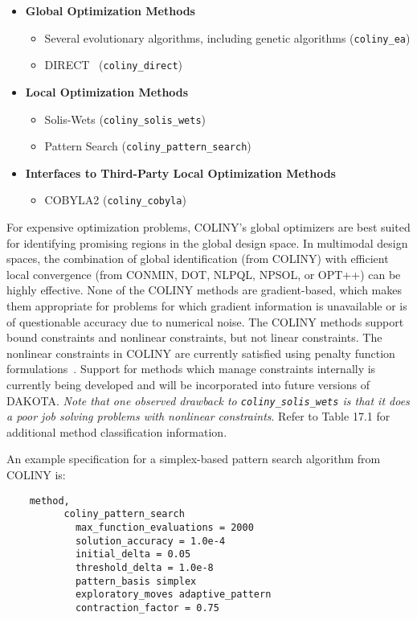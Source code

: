 \begin{itemize}

\item {\bf Global Optimization Methods}
\begin{itemize}
\item Several evolutionary algorithms, including genetic algorithms
      (\texttt{coliny\_ea})
\item DIRECT~\cite{Per93} (\texttt{coliny\_direct})
\end{itemize}

\item {\bf Local Optimization Methods}
\begin{itemize}
\item Solis-Wets (\texttt{coliny\_solis\_wets})
\item Pattern Search (\texttt{coliny\_pattern\_search})
\end{itemize}

\item {\bf Interfaces to Third-Party Local Optimization Methods}
\begin{itemize}
\item COBYLA2 (\texttt{coliny\_cobyla})
\end{itemize}

\end{itemize}

For expensive optimization problems, COLINY's global optimizers are
best suited for identifying promising regions in the global design
space. In multimodal design spaces, the combination of global
identification (from COLINY) with efficient local convergence (from
CONMIN, DOT, NLPQL, NPSOL, or OPT++) can be highly effective. None of
the COLINY methods are gradient-based, which makes them appropriate
for problems for which gradient information is unavailable or is of
questionable accuracy due to numerical noise. The COLINY methods
support bound constraints and nonlinear constraints, but not linear
constraints.  The nonlinear constraints in COLINY are currently
satisfied using penalty function formulations~\cite{Pon96}. Support
for methods which manage constraints internally is currently being
developed and will be incorporated into future versions of DAKOTA.
\emph{Note that one observed drawback to \texttt{coliny\_solis\_wets}
is that it does a poor job solving problems with nonlinear
constraints}.  Refer to Table 17.1 for additional method
classification information.

An example specification for a simplex-based pattern search algorithm
from COLINY is:
\begin{small}
\begin{verbatim}
    method,
          coliny_pattern_search
            max_function_evaluations = 2000
            solution_accuracy = 1.0e-4
            initial_delta = 0.05
            threshold_delta = 1.0e-8
            pattern_basis simplex
            exploratory_moves adaptive_pattern
            contraction_factor = 0.75
\end{verbatim}
\end{small}

